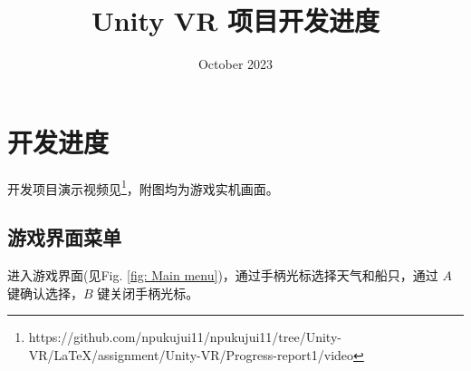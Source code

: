 \documentclass[a4paper,10pt]{article}
\begin{document}
	
	
	\title{\songti {}Unity VR 项目开发进度}
	\date{\textrm{October 2023}}
	\maketitle
	
	\renewcommand{\figurename}{Figure} %
	\renewcommand{\contentsname}{Contents}
	\renewcommand{\tablename}{Table}
	\tableofcontents  %
		
	\section{开发进度}
	
		开发项目演示视频见\footnote{https://github.com/npukujui11/npukujui11/tree/Unity-VR/LaTeX/assignment/Unity-VR/Progress-report1/video}，附图均为游戏实机画面。

		\subsection{游戏界面菜单}	
		
		进入游戏界面(见Fig. \ref{fig: Main menu})，通过手柄光标选择天气和船只，通过 $A$ 键确认选择，$B$ 键关闭手柄光标。
		
\end{document}
